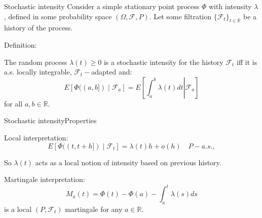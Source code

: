 \documentclass[aspectratio=169]{beamer}
\newcommand{\E}[1]{E\left[#1 \right]}
\begin{document}
\begin{frame}{Stochastic intensity}
	Consider a simple stationary point process $\Phi$ with intensity $\lambda$, defined in some probability space $(\Omega, \mathcal{F},P)$. Let some filtration $\{\mathcal{F}_t\}_{t\in\mathbb{R}}$ be a \alert{history} of the process.

	\bigskip

	\begin{block}{Definition:}

		The random process $\lambda(t)\geqslant 0$ is a \alert{stochastic intensity} for the history $\mathcal{F}_t$ iff it is a.s. locally integrable, $\mathcal{F}_t-$adapted and:
		\begin{equation*}
			\E{\Phi((a,b])\mid \mathcal{F}_a} = \E{\left.\int_a^b \lambda(t)dt \right| \mathcal{F}_a}
		\end{equation*}
		for all $a,b\in \mathbb{R}$.
	\end{block}

\end{frame}

\begin{frame}{Stochastic intensity}{Properties}

	
	\alert{Local interpretation:}
		\begin{equation*}
			E[\Phi((t,t+h])\mid \mathcal{F}_t] = \lambda(t)h + o(h) \quad P-a.s.,
		\end{equation*}
	
	So $\lambda(t)$ acts as a \alert{local} notion of intensity based on previous history.

	\pause \vfill
	\alert{Martingale interpretation:}
		\begin{equation*}
			M_a(t) = \Phi(t) - \Phi(a) - \int_a^t \lambda(s)ds
		\end{equation*} 
		is a local $(P,\mathcal{F}_t)$ martingale for any $a\in\mathbb{R}$.
	


\end{frame}
\end{document}
